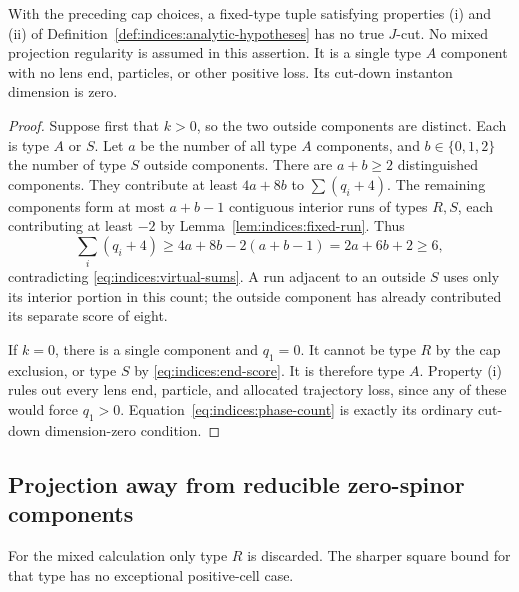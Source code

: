 \begin{proposition}\label{prop:indices:fixed-exclusion}
With the preceding cap choices, a fixed-type tuple satisfying properties
(i) and (ii) of Definition~\ref{def:indices:analytic-hypotheses} has no
true $J$-cut.  No mixed projection regularity is assumed in this assertion.
It is a single type $A$ component with no lens end, particles, or other
positive loss.  Its cut-down instanton dimension is zero.
\end{proposition}
\begin{proof}
Suppose first that $k>0$, so the two outside components are distinct.
Each is type $A$ or $S$.  Let $a$ be the number of all type $A$ components,
and $b\in\{0,1,2\}$ the number of type $S$ outside components.
There are $a+b\ge2$ distinguished components.  They contribute at least
$4a+8b$ to $\sum(q_i+4)$.  The remaining components form at most
$a+b-1$ contiguous interior runs of types $R,S$, each contributing at
least $-2$ by Lemma~\ref{lem:indices:fixed-run}.  Thus
\[
 \sum_i(q_i+4)\ge4a+8b-2(a+b-1)
                  =2a+6b+2\ge6,
\]
contradicting \eqref{eq:indices:virtual-sums}.  A run adjacent to an
outside $S$ uses only its interior portion in this count; the outside
component has already contributed its separate score of eight.

If $k=0$, there is a single component and $q_1=0$.  It cannot be type $R$
by the cap exclusion, or type $S$ by \eqref{eq:indices:end-score}.
It is therefore type $A$.  Property (i) rules out every lens end,
particle, and allocated trajectory loss, since any of these would force
$q_1>0$.  Equation~\eqref{eq:indices:phase-count} is exactly its ordinary
cut-down dimension-zero condition.
\end{proof}

\subsection{Projection away from reducible zero-spinor components}

For the mixed calculation only type $R$ is discarded.  The sharper square
bound for that type has no exceptional positive-cell case.

